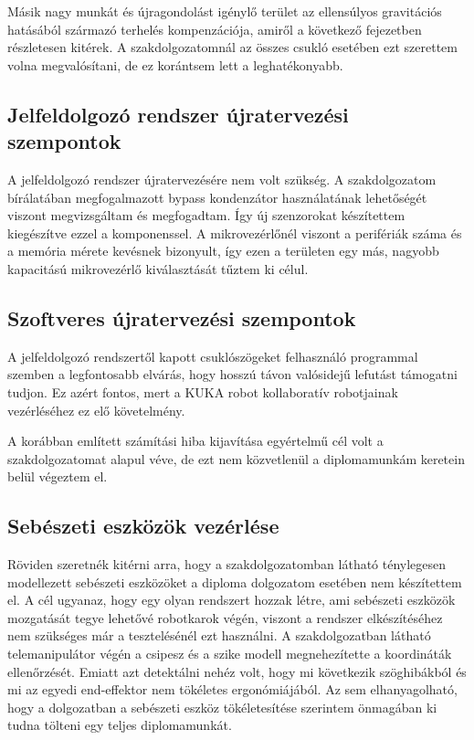 Másik nagy munkát és újragondolást igénylő terület az ellensúlyos gravitációs hatásából származó terhelés kompenzációja, amiről a következő fejezetben részletesen kitérek. A szakdolgozatomnál az összes csukló esetében ezt szerettem volna megvalósítani, de ez korántsem lett a leghatékonyabb.

\subsection{Jelfeldolgozó rendszer újratervezési szempontok}

A jelfeldolgozó rendszer újratervezésére nem volt szükség. A szakdolgozatom bírálatában megfogalmazott bypass kondenzátor használatának lehetőségét viszont megvizsgáltam és megfogadtam. Így új szenzorokat készítettem kiegészítve ezzel a komponenssel. A mikrovezérlőnél viszont a perifériák száma és a memória mérete kevésnek bizonyult, így ezen a területen egy más, nagyobb kapacitású mikrovezérlő kiválasztását tűztem ki célul.

\subsection{Szoftveres újratervezési szempontok}

A jelfeldolgozó rendszertől kapott csuklószögeket felhasználó programmal szemben a legfontosabb elvárás, hogy hosszú távon valósidejű lefutást támogatni tudjon. Ez azért fontos, mert a KUKA robot kollaboratív robotjainak vezérléséhez ez elő követelmény.

A korábban említett számítási hiba kijavítása egyértelmű cél volt a szakdolgozatomat alapul véve, de ezt nem közvetlenül a diplomamunkám keretein belül végeztem el.

\newpage
\subsection{Sebészeti eszközök vezérlése}

Röviden szeretnék kitérni arra, hogy a szakdolgozatomban látható ténylegesen modellezett sebészeti eszközöket a diploma dolgozatom esetében nem készítettem el. A cél ugyanaz, hogy egy olyan rendszert hozzak létre, ami sebészeti eszközök mozgatását tegye lehetővé robotkarok végén, viszont a rendszer elkészítéséhez nem szükséges már a tesztelésénél ezt használni. A szakdolgozatban látható telemanipulátor végén a csipesz és a szike modell megnehezítette a koordináták ellenőrzését. Emiatt azt detektálni nehéz volt, hogy mi következik szöghibákból és mi az egyedi end-effektor nem tökéletes ergonómiájából. Az sem elhanyagolható, hogy a dolgozatban a sebészeti eszköz tökéletesítése szerintem önmagában ki tudna tölteni egy teljes diplomamunkát.

